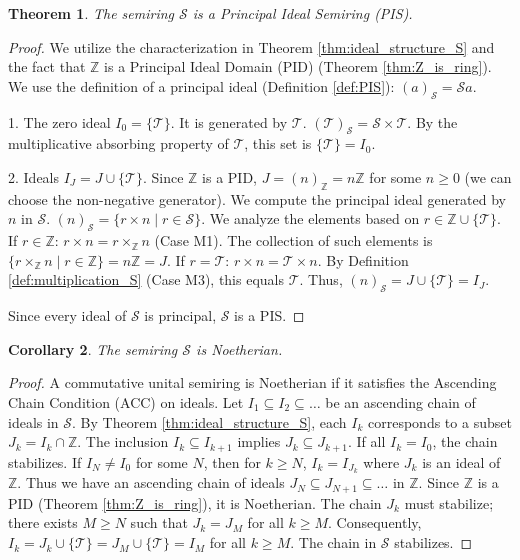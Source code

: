 \documentclass[11pt, a4paper]{article}
\theoremstyle{plain}
\newtheorem{theorem}{Theorem}[section]
\newtheorem{corollary}[theorem]{Corollary}
\theoremstyle{definition}
\numberwithin{equation}{section}
\newcommand{\Z}{\mathbb{Z}}
\newcommand{\Tobj}{\mathcal{T}} %
\newcommand{\SemiringS}{\mathcal{S}}
\begin{document}
\begin{theorem}\label{thm:S_is_PIS}
The semiring $\SemiringS$ is a Principal Ideal Semiring (PIS).
\end{theorem}
\begin{proof}
We utilize the characterization in Theorem \ref{thm:ideal_structure_S} and the fact that $\Z$ is a Principal Ideal Domain (PID) (Theorem \ref{thm:Z_is_ring}). We use the definition of a principal ideal (Definition \ref{def:PIS}): $(a)_{\SemiringS} = \SemiringS a$.

1. The zero ideal $I_0=\{\Tobj\}$. It is generated by $\Tobj$. $( \Tobj )_{\SemiringS} = \SemiringS\times\Tobj$. By the multiplicative absorbing property of $\Tobj$, this set is $\{\Tobj\} = I_0$.

2. Ideals $I_J = J \cup \{\Tobj\}$. Since $\Z$ is a PID, $J=(n)_{\Z}=n\Z$ for some $n \ge 0$ (we can choose the non-negative generator).
We compute the principal ideal generated by $n$ in $\SemiringS$.
$(n)_{\SemiringS} = \{r\times n \mid r \in \SemiringS\}$.
We analyze the elements based on $r \in \Z \cup \{\Tobj\}$.
If $r \in \Z$: $r\times n = r\times_{\Z} n$ (Case M1). The collection of such elements is $\{r\times_{\Z} n \mid r \in \Z\} = n\Z = J$.
If $r=\Tobj$: $r\times n = \Tobj\times n$. By Definition \ref{def:multiplication_S} (Case M3), this equals $\Tobj$.
Thus, $(n)_{\SemiringS} = J \cup \{\Tobj\} = I_J$.

Since every ideal of $\SemiringS$ is principal, $\SemiringS$ is a PIS.
\end{proof}

\begin{corollary}\label{cor:S_is_Noetherian}
The semiring $\SemiringS$ is Noetherian.
\end{corollary}
\begin{proof}
A commutative unital semiring is Noetherian if it satisfies the Ascending Chain Condition (ACC) on ideals. Let $I_1 \subseteq I_2 \subseteq \dots$ be an ascending chain of ideals in $\SemiringS$.
By Theorem \ref{thm:ideal_structure_S}, each $I_k$ corresponds to a subset $J_k = I_k \cap \Z$. The inclusion $I_k \subseteq I_{k+1}$ implies $J_k \subseteq J_{k+1}$.
If all $I_k=I_0$, the chain stabilizes.
If $I_N \neq I_0$ for some $N$, then for $k\ge N$, $I_k=I_{J_k}$ where $J_k$ is an ideal of $\Z$.
Thus we have an ascending chain of ideals $J_N \subseteq J_{N+1} \subseteq \dots$ in $\Z$.
Since $\Z$ is a PID (Theorem \ref{thm:Z_is_ring}), it is Noetherian. The chain $J_k$ must stabilize; there exists $M\ge N$ such that $J_k=J_M$ for all $k\ge M$.
Consequently, $I_k = J_k \cup \{\Tobj\} = J_M \cup \{\Tobj\} = I_M$ for all $k\ge M$. The chain in $\SemiringS$ stabilizes.
\end{proof}
\end{document}
